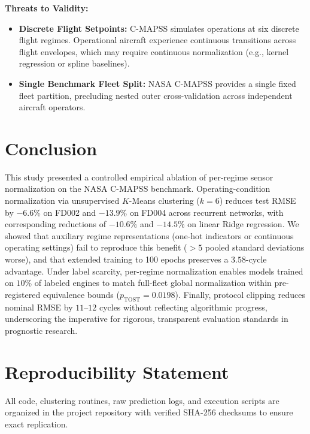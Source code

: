 \documentclass[conference]{IEEEtran}
\begin{document}
\textbf{Threats to Validity:}
\begin{itemize}
    \item \textbf{Discrete Flight Setpoints:} C-MAPSS simulates operations at six discrete flight regimes. Operational aircraft experience continuous transitions across flight envelopes, which may require continuous normalization (e.g., kernel regression or spline baselines).
    \item \textbf{Single Benchmark Fleet Split:} NASA C-MAPSS provides a single fixed fleet partition, precluding nested outer cross-validation across independent aircraft operators.
\end{itemize}

\section{Conclusion}
This study presented a controlled empirical ablation of per-regime sensor normalization on the NASA C-MAPSS benchmark. Operating-condition normalization via unsupervised $K$-Means clustering ($k=6$) reduces test RMSE by $-6.6\%$ on FD002 and $-13.9\%$ on FD004 across recurrent networks, with corresponding reductions of $-10.6\%$ and $-14.5\%$ on linear Ridge regression. We showed that auxiliary regime representations (one-hot indicators or continuous operating settings) fail to reproduce this benefit ($>5$ pooled standard deviations worse), and that extended training to 100 epochs preserves a $3.58$-cycle advantage. Under label scarcity, per-regime normalization enables models trained on $10\%$ of labeled engines to match full-fleet global normalization within pre-registered equivalence bounds ($p_{\text{TOST}} = 0.0198$). Finally, protocol clipping reduces nominal RMSE by $11$--$12$ cycles without reflecting algorithmic progress, underscoring the imperative for rigorous, transparent evaluation standards in prognostic research.

\section*{Reproducibility Statement}
All code, clustering routines, raw prediction logs, and execution scripts are organized in the project repository with verified SHA-256 checksums to ensure exact replication.



\end{document}
